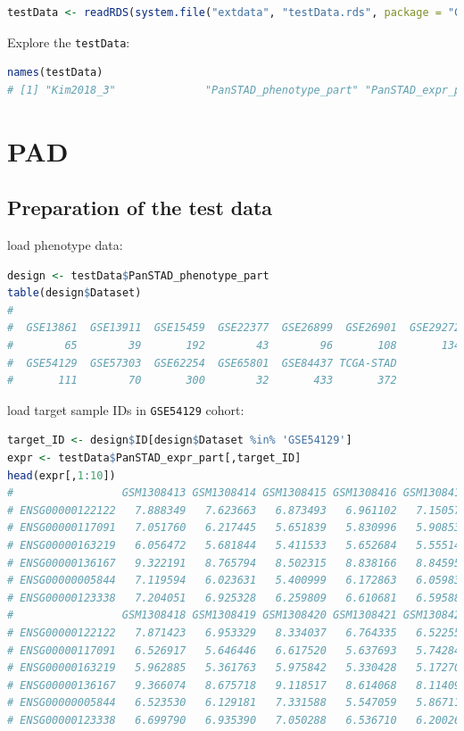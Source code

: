 \documentclass[
  12pt,
]{book}
\newcommand{\passthrough}[1]{#1}
\begin{document}
\begin{lstlisting}[language=R]
testData <- readRDS(system.file("extdata", "testData.rds", package = "GSClassifier"))
\end{lstlisting}

Explore the \passthrough{\lstinline!testData!}:

\begin{lstlisting}[language=R]
names(testData)
# [1] "Kim2018_3"              "PanSTAD_phenotype_part" "PanSTAD_expr_part"
\end{lstlisting}

\hypertarget{pad}{%
\section{PAD}\label{pad}}

\hypertarget{preparation-of-the-test-data}{%
\subsection{Preparation of the test data}\label{preparation-of-the-test-data}}

load phenotype data:

\begin{lstlisting}[language=R]
design <- testData$PanSTAD_phenotype_part
table(design$Dataset)
# 
#  GSE13861  GSE13911  GSE15459  GSE22377  GSE26899  GSE26901  GSE29272  GSE51105 
#        65        39       192        43        96       108       134        94 
#  GSE54129  GSE57303  GSE62254  GSE65801  GSE84437 TCGA-STAD 
#       111        70       300        32       433       372
\end{lstlisting}

load target sample IDs in \passthrough{\lstinline!GSE54129!} cohort:

\begin{lstlisting}[language=R]
target_ID <- design$ID[design$Dataset %in% 'GSE54129']
expr <- testData$PanSTAD_expr_part[,target_ID]
head(expr[,1:10])
#                 GSM1308413 GSM1308414 GSM1308415 GSM1308416 GSM1308417
# ENSG00000122122   7.888349   7.623663   6.873493   6.961102   7.150572
# ENSG00000117091   7.051760   6.217445   5.651839   5.830996   5.908532
# ENSG00000163219   6.056472   5.681844   5.411533   5.652684   5.555147
# ENSG00000136167   9.322191   8.765794   8.502315   8.838166   8.845952
# ENSG00000005844   7.119594   6.023631   5.400999   6.172863   6.059838
# ENSG00000123338   7.204051   6.925328   6.259809   6.610681   6.595882
#                 GSM1308418 GSM1308419 GSM1308420 GSM1308421 GSM1308422
# ENSG00000122122   7.871423   6.953329   8.334037   6.764335   6.522554
# ENSG00000117091   6.526917   5.646446   6.617520   5.637693   5.742848
# ENSG00000163219   5.962885   5.361763   5.975842   5.330428   5.172705
# ENSG00000136167   9.366074   8.675718   9.118517   8.614068   8.114096
# ENSG00000005844   6.523530   6.129181   7.331588   5.547059   5.867118
# ENSG00000123338   6.699790   6.935390   7.050288   6.536710   6.200269
\end{lstlisting}
\end{document}
